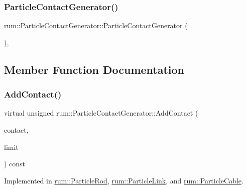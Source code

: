 \mbox{\label{classrum_1_1_particle_contact_generator_aefec37ffef72a54397c6952c6d2e65ba}} 
\subsubsection{\texorpdfstring{Particle\+Contact\+Generator()}{ParticleContactGenerator()}}
{\footnotesize\ttfamily rum\+::\+Particle\+Contact\+Generator\+::\+Particle\+Contact\+Generator (\begin{DoxyParamCaption}{ }\end{DoxyParamCaption})\hspace{0.3cm}{\ttfamily [explicit]}, {\ttfamily [protected]}}



\subsection{Member Function Documentation}
\mbox{\label{classrum_1_1_particle_contact_generator_a99c829af7d261ff236a4d829374daa9b}} 
\subsubsection{\texorpdfstring{Add\+Contact()}{AddContact()}}
{\footnotesize\ttfamily virtual unsigned rum\+::\+Particle\+Contact\+Generator\+::\+Add\+Contact (\begin{DoxyParamCaption}\item[{\hyperlink{classrum_1_1_particle_contact}{Particle\+Contact} $\ast$}]{contact,  }\item[{unsigned int}]{limit }\end{DoxyParamCaption}) const\hspace{0.3cm}{\ttfamily [pure virtual]}}



Implemented in \hyperlink{classrum_1_1_particle_rod_abc0fad39193787cb65e937cd7d20874e}{rum\+::\+Particle\+Rod}, \hyperlink{classrum_1_1_particle_link_a86e7dbac23cd26fce627bf5ed1fae6f5}{rum\+::\+Particle\+Link}, and \hyperlink{classrum_1_1_particle_cable_a06c6184b7e1d6047db4f732b132fb329}{rum\+::\+Particle\+Cable}.



